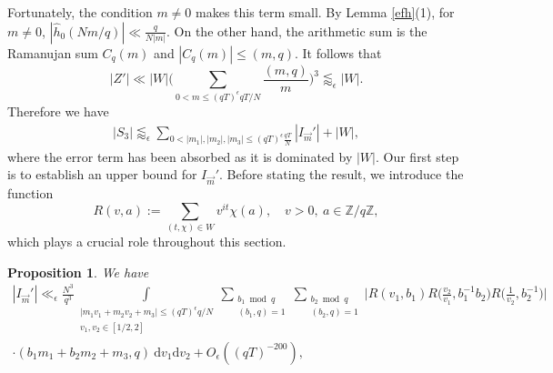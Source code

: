\documentclass[12pt]{amsart}
\newtheorem{proposition}[theorem]{Proposition}
\theoremstyle{definition}
\theoremstyle{plain}
\theoremstyle{remark}
\numberwithin{equation}{section}
\numberwithin{theorem}{section}
\numberwithin{equation}{section}
\begin{document}
	Fortunately, the condition $m\neq 0$ makes this term small. By Lemma \ref{efh}(1), for $m\neq 0$,
	$
	|\hat{h}_0(Nm/q)|
	\ll \frac{q}{N|m|}.
	$
	On the other hand, the arithmetic sum is the Ramanujan sum $C_q(m)$ and $|C_q(m)|
	\leq (m,q).
	$
	It follows that
	\[
	|Z'|
	\ll
	|W|
	\bigg(
	\sum_{0<m \leq(qT)^{\epsilon} qT/N}
	\frac{(m,q)}{m}
	\bigg)^3
	\lessapprox_{\epsilon} |W|.
	\]
	Therefore we have 
	\begin{align}\label{S3cut}
		|S_3| \lessapprox_{\epsilon} \sum_{0 < |m_1|,|m_2|, |m_3| \leq(qT)^{\epsilon} \frac{qT}{N}} |I_{\overrightarrow{m}}'| + |W|,
	\end{align}
	where the error term has been absorbed as it is dominated by $|W|$.
	Our first step is to establish an upper bound for $I_{\overrightarrow{m}}'$. Before stating the result, we introduce the function
	\begin{equation}\label{funcR}
		R(v,a):=\sum_{(t, \chi) \in W}v^{it}\chi(a), \quad v > 0, \ a\in \mathbb{Z}/q\mathbb{Z},
	\end{equation}
	which plays a crucial role throughout this section.
	\begin{proposition}\label{Imbound}
		We have
		\begin{align*}
			|I_{\overrightarrow{m}}'|\ll_{\epsilon} \frac{N^{3}}{q^{3}}\int\limits_{\substack{|m_{1}v_{1}+m_{2}v_{2}+m_{3}| \leq(qT)^{\epsilon}q/N  \\ v_{1}, v_{2}\in [1/2, 2]}}\sum_{\substack{b_1 \bmod q \\ (b_{1}, q)=1}}\sum_{\substack{b_2 \bmod q \\ (b_{2}, q)=1}}\bigg| R(v_{1}, b_{1})R\bigg(\frac{v_{2}}{v_{1}}, b_{1}^{-1}b_{2}\bigg)R\bigg(\frac{1}{v_{2}}, b_{2}^{-1}\bigg)\bigg|
			\\
			\cdot(b_{1}m_{1}+b_{2}m_{2}+m_{3},q)\:\mathrm{d}v_{1}\mathrm{d}v_{2}+O_{\epsilon}((qT)^{-200}),
		\end{align*}
	\end{proposition}
\end{document}
